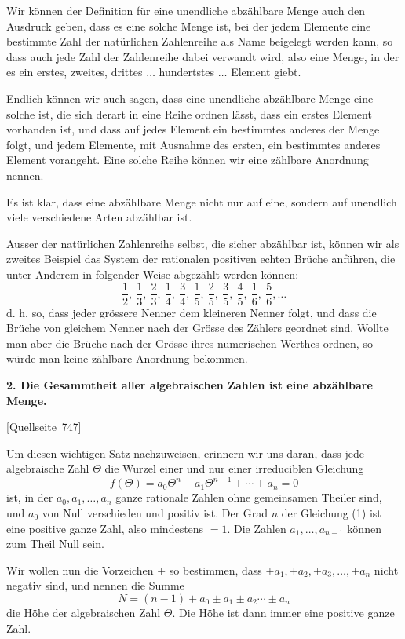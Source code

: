 \documentclass[11pt]{article}
\newcommand{\srcpage}[1]{\par\medskip\noindent\textsf{[Quellseite~#1]}\par\smallskip}
\begin{document}
Wir können der Definition für eine unendliche abzählbare Menge auch den Ausdruck geben, dass es eine solche Menge ist, bei der jedem Elemente eine bestimmte Zahl der natürlichen Zahlenreihe als Name beigelegt werden kann, so dass auch jede Zahl der Zahlenreihe dabei verwandt wird, also eine Menge, in der es ein erstes, zweites, drittes $\ldots$ hundertstes $\ldots$ Element giebt.

Endlich können wir auch sagen, dass eine unendliche abzählbare Menge eine solche ist, die sich derart in eine Reihe ordnen lässt, dass ein erstes Element vorhanden ist, und dass auf jedes Element ein bestimmtes anderes der Menge folgt, und jedem Elemente, mit Ausnahme des ersten, ein bestimmtes anderes Element vorangeht. Eine solche Reihe können wir eine zählbare Anordnung nennen.

Es ist klar, dass eine abzählbare Menge nicht nur auf eine, sondern auf unendlich viele verschiedene Arten abzählbar ist.

Ausser der natürlichen Zahlenreihe selbst, die sicher abzählbar ist, können wir als zweites Beispiel das System der rationalen positiven echten Brüche anführen, die unter Anderem in folgender Weise abgezählt werden können:
\[
\frac12,\ \frac13,\ \frac23,\ \frac14,\ \frac34,\ \frac15,\ \frac25,\ \frac35,\ \frac45,\ \frac16,\ \frac56,\ldots
\]
d. h. so, dass jeder grössere Nenner dem kleineren Nenner folgt, und dass die Brüche von gleichem Nenner nach der Grösse des Zählers geordnet sind. Wollte man aber die Brüche nach der Grösse ihres numerischen Werthes ordnen, so würde man keine zählbare Anordnung bekommen.

\textbf{2. Die Gesammtheit aller algebraischen Zahlen ist eine abzählbare Menge.}

\srcpage{747}
Um diesen wichtigen Satz nachzuweisen, erinnern wir uns daran, dass jede algebraische Zahl $\Theta$ die Wurzel einer und nur einer irreduciblen Gleichung
\begin{equation}\tag{1}
f(\Theta)=a_0\Theta^n+a_1\Theta^{n-1}+\cdots+a_n=0
\end{equation}
ist, in der $a_0,a_1,\ldots,a_n$ ganze rationale Zahlen ohne gemeinsamen Theiler sind, und $a_0$ von Null verschieden und positiv ist. Der Grad $n$ der Gleichung (1) ist eine positive ganze Zahl, also mindestens $=1$. Die Zahlen $a_1,\ldots,a_{n-1}$ können zum Theil Null sein.

Wir wollen nun die Vorzeichen $\pm$ so bestimmen, dass $\pm a_1,\pm a_2,\pm a_3,\ldots,\pm a_n$ nicht negativ sind, und nennen die Summe
\begin{equation}\tag{2}
N=(n-1)+a_0\pm a_1\pm a_2\cdots\pm a_n
\end{equation}
die Höhe der algebraischen Zahl $\Theta$. Die Höhe ist dann immer eine positive ganze Zahl.
\end{document}
